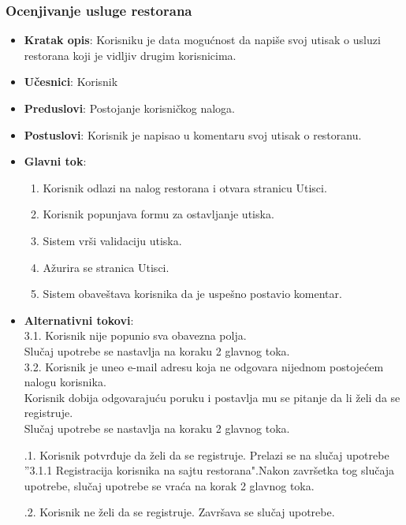  
\subsubsection{Ocenjivanje usluge restorana}
\begin{itemize}
    \item \textbf{Kratak opis}:
    Korisniku je data mogućnost da napiše svoj utisak o usluzi restorana koji je vidljiv drugim korisnicima.
    \item \textbf{Učesnici}:
    Korisnik
    \item \textbf{Preduslovi}:
    Postojanje korisničkog naloga. 
    \item \textbf{Postuslovi}:
    Korisnik je napisao u komentaru svoj utisak
    o restoranu.
    \item \textbf{Glavni tok}:
   \begin{enumerate}
        \item Korisnik odlazi na nalog restorana i otvara stranicu Utisci.
        \item Korisnik popunjava formu za ostavljanje utiska.
        \item Sistem vrši validaciju utiska.
        \item Ažurira se stranica Utisci.
        \item Sistem obaveštava korisnika da je uspešno postavio komentar.
    \end{enumerate}
\end{itemize}
\begin{itemize}
\item \textbf {Alternativni tokovi}:\\ 
 3.1. Korisnik nije popunio sva obavezna polja.\\
 Slučaj upotrebe se nastavlja na koraku 2 glavnog toka.\\
 3.2. Korisnik je uneo e-mail adresu koja ne odgovara nijednom postojećem nalogu korisnika. \\
 Korisnik dobija odgovarajuću poruku i postavlja mu se pitanje da li želi da se registruje. \\
 Slučaj upotrebe se nastavlja na koraku 2 glavnog toka.
 
.1. Korisnik potvrđuje da želi da se registruje.
Prelazi se na slučaj upotrebe ”3.1.1 Registracija korisnika na sajtu restorana".Nakon završetka tog slučaja upotrebe, slučaj upotrebe se vraća
na korak 2 glavnog toka. 

.2. Korisnik ne želi da se registruje. Završava se slučaj upotrebe.
\end{itemize}

